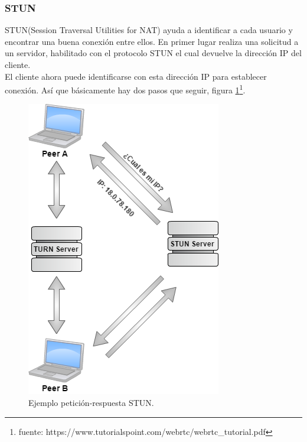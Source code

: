\subsubsection*{STUN}
STUN(Session Traversal Utilities for NAT) ayuda a identificar a cada usuario y encontrar una buena conexión entre ellos. En primer lugar realiza una solicitud a un servidor, habilitado con el protocolo STUN el cual devuelve la dirección IP del cliente. 
\\El cliente ahora puede identificarse con esta dirección IP para establecer conexión. Así que básicamente hay dos pasos que seguir, figura \ref{fig:STUN_Example}\footnote{fuente: https://www.tutorialspoint.com/webrtc/webrtc\_tutorial.pdf}.
\begin{figure}[!h]
\begin{center}
   \includegraphics[width=0.3\linewidth]{Figures/STUN_Example}
	\decoRule
	\caption[Ejemplo petición-respuesta STUN]{Ejemplo petición-respuesta STUN.}
\label{fig:STUN_Example}
\end{center}
\end{figure}
